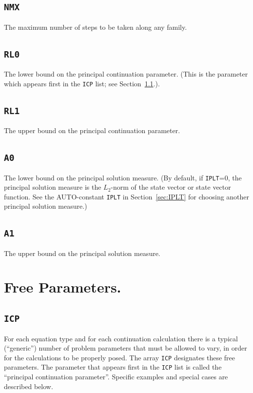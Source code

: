 \documentclass[12pt]{report}
\begin{document}
\subsection{\tt NMX} \label{sec:NMX}
The maximum number of steps to be taken along any family.

\subsection{\tt RL0}  \label{sec:RL0}
 The lower bound on the principal continuation parameter.
 (This is the parameter which appears first in the {\tt ICP} list;
 see Section~\ref{sec:ICP}.). 

\subsection{\tt RL1}  \label{sec:RL1}
 The upper bound on the principal continuation parameter. 

\subsection{\tt A0}  \label{sec:A0}
 The lower bound on the principal solution measure.
 (By default, if {\tt IPLT}=0, the principal solution measure
 is the $L_2$-norm of the state vector or state vector function.
 See the {\cal AUTO}-constant {\tt IPLT} in Section~\ref{sec:IPLT} 
 for choosing another principal solution measure.)

\subsection{\tt A1}  \label{sec:A1}
 The upper bound on the principal solution measure.

\section{ Free Parameters.} \label{sec:Free_parameters}


\subsection{\tt ICP}  \label{sec:ICP}
For each equation type and for each continuation calculation there is
a typical (``generic'') number of problem parameters that must be 
allowed to vary, in order for the calculations to be properly posed.
The array {\tt ICP} designates these free parameters.
The parameter that appears first in the {\tt ICP} list is called the 
``principal continuation parameter''.
Specific examples and special cases are described below.
\end{document}
